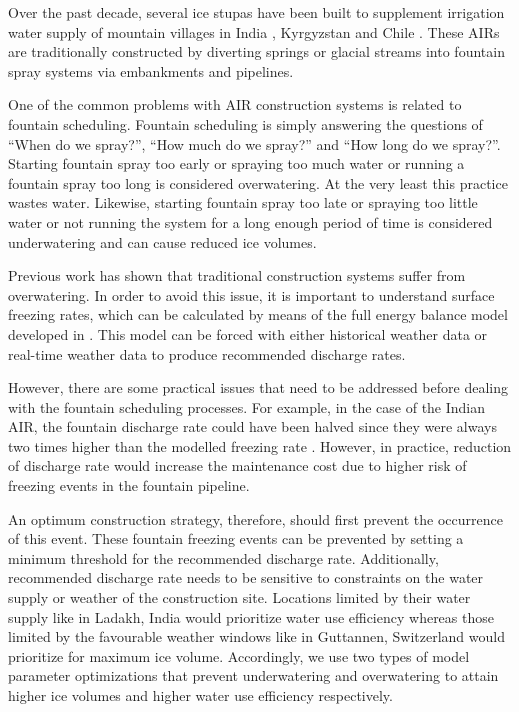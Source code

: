 \documentclass[tc, manuscript]{copernicus}
\begin{document}
Over the past decade, several ice stupas have been built to supplement irrigation water supply of mountain
villages in India \citep{wangchukIceStupaCompetition2020, palmerStoringFrozenWater2022,
aggarwalAdaptationClimateChange2021}, Kyrgyzstan \citep{bbcnewsBrightArtificialGlacier2020} and Chile
\citep{reutersConservationistsChileAim2021}. These AIRs are traditionally constructed by diverting springs or
glacial streams into fountain spray systems via embankments and pipelines. 

One of the common problems with AIR construction systems is related to fountain scheduling. Fountain scheduling
is simply answering the questions of “When do we spray?”, “How much do we spray?” and “How long do we spray?”.
Starting fountain spray too early or spraying too much water or running a fountain spray too long is considered
overwatering. At the very least this practice wastes water.  Likewise, starting fountain spray too late or
spraying too little water or not running the system for a long enough period of time is considered underwatering and can cause reduced ice volumes.

Previous work \citep{balasubramanianInfluenceMeteorologicalConditions2022} has shown that traditional
construction systems suffer from overwatering. In order to avoid this issue, it is important to understand surface freezing rates, which can be calculated by means of the full energy balance model
developed in \cite{balasubramanianInfluenceMeteorologicalConditions2022}. This model can be forced with either
historical weather data or real-time weather data to produce recommended discharge rates.

However, there are some practical issues that need to be addressed before dealing with the fountain scheduling
processes. For example, in the case of the Indian AIR, the fountain discharge rate could have been halved since
they were always two times higher than the modelled freezing rate
\citep{balasubramanianInfluenceMeteorologicalConditions2022}. However, in practice, reduction of discharge rate
would increase the maintenance cost due to higher risk of freezing events in the fountain pipeline.

An optimum construction strategy, therefore, should first prevent the occurrence of this event. These fountain
freezing events can be prevented by setting a minimum threshold for the recommended discharge rate.
Additionally, recommended discharge rate needs to be sensitive to constraints on the water supply or weather of
the construction site. Locations limited by their water supply like in Ladakh, India would prioritize water use
efficiency whereas those limited by the favourable weather windows like in Guttannen, Switzerland  would
prioritize for maximum ice volume.  Accordingly, we use two types of model parameter optimizations that prevent
underwatering and overwatering to attain higher ice volumes and higher water use efficiency respectively.
\end{document}

